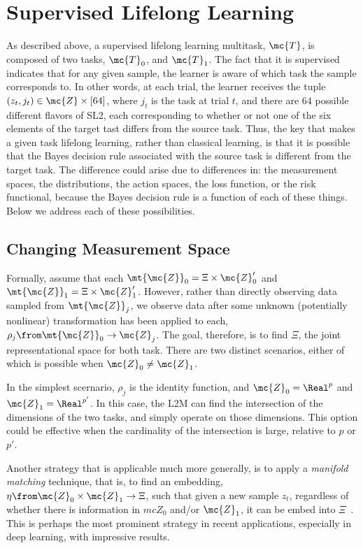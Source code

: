 \documentclass{article}
\begin{document}
\section{Supervised Lifelong Learning}
\label{sec:transfer}

As described above,  a supervised lifelong learning multitask, $\mc{T}$, is composed of two tasks, $\mc{T}_0$, and $\mc{T}_1$.  The fact that it is supervised indicates that for any given sample, the learner is aware of which task the sample corresponds to.  In other words, at each trial, the learner receives the tuple $(z_t, j_t) \in \mc{Z} \times [64]$, where $j_t$ is the task at trial $t$, and there are $64$ possible different flavors of SL2, each corresponding to whether or not one of the six elements of the target tast differs from the source task.    
Thus, the key that makes a given task lifelong learning, rather than classical learning, is that it is possible that the Bayes decision rule associated with the source task is different from the target task.  The difference could arise due to differences in: the measurement spaces, the distributions, the action spaces, the loss function, or the risk functional, because the Bayes decision rule is a function of each of these things.  Below we address each of these possibilities.


\subsection{Changing Measurement Space}

Formally, assume that each $\mt{\mc{Z}}_0=\Xi \times \mc{Z}_0'$ and $\mt{\mc{Z}}_1 = \Xi \times \mc{Z}_1'$.  However, rather than directly observing data sampled from $\mt{\mc{Z}}_j$, we observe data after some unknown (potentially nonlinear) transformation has been applied to each, $\rho_j \from \mt{\mc{Z}}_0 \to \mc{Z}_j$. The goal, therefore, is to find $\Xi$, the joint representational space for both task.  There are two distinct scenarios, either of which is possible when $\mc{Z}_0 \neq \mc{Z}_1$. 

In the simplest scernario,  $\rho_j$ is the identity function, and $\mc{Z}_0 = \Real^p$ and $\mc{Z}_1 = \Real^{p'}$.  In this case, the L2M can find the intersection of the dimensions of the two tasks, and simply operate on those dimensions.  This option could be effective when the cardinality of the intersection is large, relative to $p$ or $p'$.  


Another strategy that is applicable much more generally,  is to apply a \emph{manifold matching} technique, that is, to find an embedding, $\eta \from \mc{Z}_0 \times \mc{Z}_1 \to \Xi$, such that given a new sample $z_t$, regardless of whether there is information in $mc{Z}_0$ and/or $\mc{Z}_1$, it can be embed into $\Xi$~\cite{Shen2017-ou}.  This is perhaps the most prominent strategy in recent applications, especially in deep learning, with impressive results.  
\end{document}
